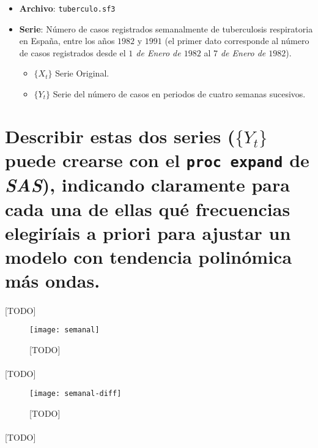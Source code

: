 \documentclass[a4paper, spanish]{article}
\begin{document}
  \maketitle

  \begin{itemize}
    \item \textbf{Archivo}: \texttt{tuberculo.sf3}
    \item \textbf{Serie}: Número de casos registrados semanalmente de tuberculosis respiratoria en España, entre los años $1982$ y $1991$ (el primer dato corresponde al número de casos registrados desde el \emph{$1$ de Enero de $1982$} al \emph{$7$ de Enero de $1982$}).
    \begin{itemize}
      \item $\{X_t\}$ Serie Original.
      \item $\{Y_t\}$ Serie del número de casos en periodos de cuatro semanas sucesivos.
    \end{itemize}
  \end{itemize}

  \section{Describir estas dos series ($\{Y_t\}$ puede crearse con el \texttt{proc expand} de \emph{SAS}), indicando claramente para cada una de ellas qué frecuencias elegiríais a priori para ajustar un modelo con tendencia polinómica más ondas.}
  \label{sec:a}

    \paragraph{}
    [TODO]


    \begin{figure}[h!]
      \centering
      \texttt{[image: semanal]}
      \caption{[TODO]}
      \label{fig:semanal}
    \end{figure}

    \paragraph{}
    [TODO]

    \begin{figure}[h!]
      \centering
      \texttt{[image: semanal-diff]}
      \caption{[TODO]}
      \label{fig:semanal_diff}
    \end{figure}

    \paragraph{}
    [TODO]
\end{document}
